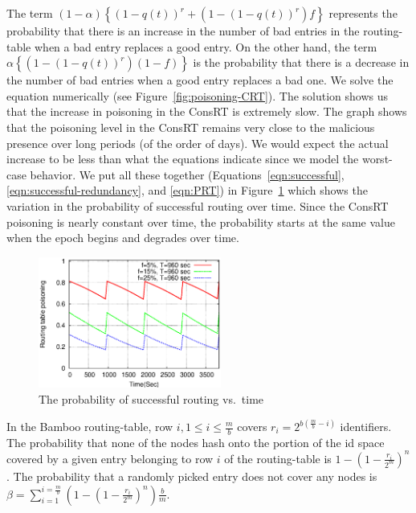 \documentclass[10pt,twocolumn]{article}
\newcommand{\pow}[2]{\ensuremath{#1}^{#2}}
\newcommand{\CRT}{ConsRT\xspace}
\begin{document}
The term $(1-\alpha) \left\{\pow{(1-q(t))}{r}+ (1-\pow{(1-q(t))}{r})f\right\}$ represents the probability that there is an increase in the number of bad entries in the routing-table when a bad entry replaces a good entry. On the other hand, the term $\alpha \left\{ (1-\pow{(1-q(t))}{r})(1-f) \right\}$ is the probability that there is a decrease in the number of bad entries when a good entry replaces a bad one.
We solve the equation numerically (see Figure~\ref{fig:poisoning-CRT}). The
solution shows us that the increase in poisoning in the \CRT is extremely
slow. The graph shows that the poisoning level in the \CRT remains very close to the malicious presence over long periods (of the order of days). 
We would expect the
actual increase to be less than what the equations
indicate since we model the worst-case behavior.
We put all these together (Equations~\ref{eqn:successful}, \ref{eqn:successful-redundancy}, and \ref{eqn:PRT}) in 
Figure~\ref{fig:successful} which shows the variation in the probability of successful routing over time. Since the \CRT poisoning is nearly constant over time, the probability starts at the same value when the epoch begins and degrades over time.

\begin{figure}
\centerline{\includegraphics[width=6cm]{graphs/equations/successful.eps}}
\caption{The probability of successful routing vs.\ time}
\label{fig:successful}
\end{figure}


\SubSection{$\beta$}
\label{appendix:beta}
In the Bamboo routing-table, row $i, 1\le i \le \frac{m}{b}$ covers
$r_i=\pow{2}{b(\frac{m}{b}-i)}$ identifiers. The probability that none
of the nodes hash onto the portion of the id space covered by a given
entry belonging to row $i$ of the routing-table is
$1-\pow{(1-\frac{r_i}{2^m})}{n}$. The probability that a randomly picked
entry does not cover any nodes is $\beta=\sum_{i=1}^{i=\frac{m}{b}}\left(1-\pow{(1-\frac{r_i}{2^m})}{n}\right) \frac{b}{m}$. 
\end{document}
